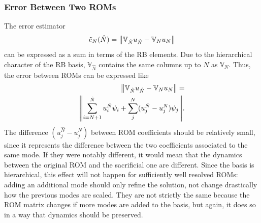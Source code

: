 \documentclass[../../thesis.tex]{subfiles}
\newcommand{\rbV}{\ensuremath{\mathbb{V}}}
\begin{document}
\subsubsection{Error Between Two ROMs}
The error estimator 
\begin{equation}
    \tilde{e}_{N}(\hat{N}) = \norm{\rbV_{\hat{N}} u_{\hat{N}} - \rbV_{N} u_{N}}
\end{equation}
can be expressed as a sum in terms of the RB elements.
Due to the hierarchical character of the RB basis, 
$\rbV_{\hat{N}}$ contains the same columns 
up to $N$ as $\rbV_{N}$.
Thus, the error between ROMs can be expressed like
\begin{equation}
    \begin{split}
        \norm{\rbV_{\hat{N}} u_{\hat{N}} - \rbV_{N} u_{N}} 
        = \\ 
        \norm{
        \sum_{i=N+1}^{\hat{N}} u^{\hat{N}}_{i} \psi_{i} 
        + 
        \sum_{j}^{N} (u^{\hat{N}}_{j} - u^{N}_{j}) \psi_j
        }.
    \end{split}
\end{equation}
The difference $(u^{\hat{N}}_{j} - u^{N}_{j})$ between ROM coefficients should be relatively small, 
since it represents the difference between the two coefficients associated to the same mode.
If they were notably different, 
it would mean that the dynamics between the original ROM and the sacrificial one are different.
Since the basis is hierarchical, this effect will not happen for sufficiently well resolved ROMs: 
adding an additional mode should only refine the solution, 
not change drastically how the previous modes are scaled.
They are not strictly the same because the ROM matrix changes if more modes are added to the basis,
but again, it does so in a way that dynamics should be preserved.
\end{document}
